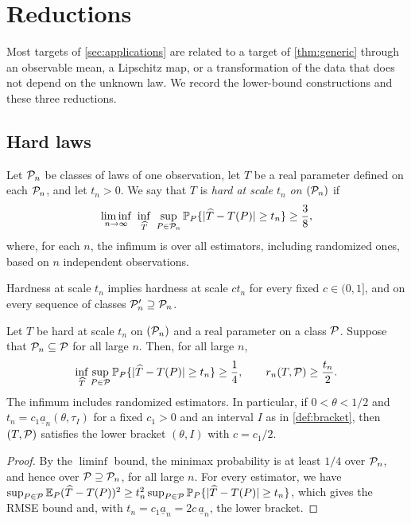 \chapter{Reductions}\label{sec:application-reductions}\label{sec:application-proofs}

Most targets of \cref{sec:applications} are related to a target
of \cref{thm:generic} through an observable mean, a Lipschitz map,
or a transformation of the data that does not depend on the unknown law.
We record the lower-bound constructions and these three reductions.

\section{Hard laws}\label{sec:app-hard-laws}

\begin{definition}[Hardness]\label{def:hard}
Let $\mathcal P_n$ be classes of laws of one observation, let $T$ be a real
parameter defined on each $\mathcal P_n$, and let $t_n>0$. We say that $T$ is
\emph{hard at scale $t_n$ on $(\mathcal P_n)$} if
\[
 \liminf_{n\to\infty}\ \inf_{\widehat T}\ \sup_{P\in\cP_n}
 \Pp_P\{|\widehat T-T(P)|\ge t_n\}\ge\frac38,
\]
where, for each $n$, the infimum is over all estimators, including
randomized ones, based on $n$ independent observations.
\end{definition}

Hardness at scale $t_n$ implies hardness at scale $ct_n$ for every fixed
$c\in(0,1]$, and on every sequence of classes $\mathcal P_n'\supseteq\mathcal P_n$.

\begin{lemma}
\label{lem:hard-risk}\label{lem:hardness-bracket}
Let $T$ be hard at scale $t_n$ on $(\mathcal P_n)$ and a real parameter on a
class $\mathcal P$. Suppose that $\mathcal P_n\subseteq\mathcal P$ for all large $n$.
Then, for all large $n$,
\begin{equation}\label{eq:hard-consequence}
 \inf_{\widehat T}\sup_{P\in\mathcal P}\mathbb P_P\{|\widehat T-T(P)|\ge t_n\}\ge\frac14,
 \qquad r_n(T,\mathcal P)\ge\frac{t_n}2 .
\end{equation}
The infimum includes randomized estimators. In particular, if
$0<\theta<1/2$ and $t_n=c_1\underline a_n(\theta,\tau_I)$ for a fixed
$c_1>0$ and an interval $I$ as in \cref{def:bracket}, then
$(T,\mathcal P)$ satisfies the lower bracket $(\theta,I)$ with $c=c_1/2$.
\end{lemma}
\begin{proof}
By the $\liminf$ bound, the minimax probability is at least $1/4$ over
$\mathcal P_n$, and hence over $\mathcal P\supseteq\mathcal P_n$, for all large $n$. For every estimator, we have
$\sup_{P\in\mathcal P}\mathbb E_P(\widehat T-T(P))^2\ge t_n^2\sup_{P\in\mathcal P}\mathbb P_P\{|\widehat T-T(P)|\ge t_n\}$,
which gives the RMSE bound and, with $t_n=c_1\underline a_n=2c\,\underline a_n$,
the lower bracket.
\end{proof}

